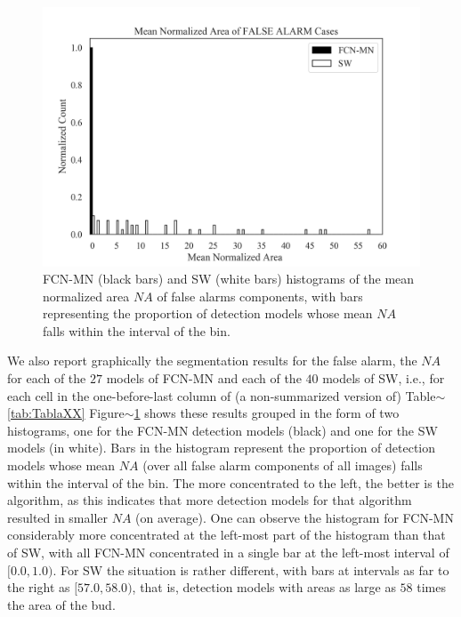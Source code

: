 \documentclass[a4paper,authoryear,review]{elsarticle}
\begin{document}









\begin{figure}%
    \centering
      \includegraphics[width=\textwidth]{figures/AAA_mean_relative_area_fcn_vs_sw.png}%
\caption{FCN-MN (black bars) and SW (white bars) histograms of the mean normalized area $NA$ of false alarms components, with bars representing the proportion of detection models whose mean $NA$ falls within the interval of the bin.}
\label{fig:AAA}
\end{figure}

We also report graphically the segmentation results for the false alarm, the $NA$  for each of the $27$ models of FCN-MN and each of the $40$ models of SW, i.e., for each cell in the  one-before-last column of (a non-summarized version of) Table$\sim$\ref{tab:TablaXX}
%
Figure$\sim$\ref{fig:AAA} shows these results grouped in the form of two histograms, one for the FCN-MN detection models (black) and one for the SW models (in white). Bars in the histogram represent the proportion of detection models whose mean $NA$ (over all false alarm components of all images) falls within the interval of the bin. The more concentrated to the left, the better is the algorithm, as this indicates that more detection models for that algorithm resulted in smaller $NA$ (on average).
%
One can observe the histogram for FCN-MN considerably more concentrated at the left-most part of the histogram than that of SW, with all FCN-MN concentrated in a single bar at the left-most interval of  $[0.0, 1.0)$. For SW the situation is rather different, with bars at intervals as far to the right as $[57.0, 58.0)$, that is, detection models with areas as large as $58$ times the area of the bud. 
%
\end{document}

